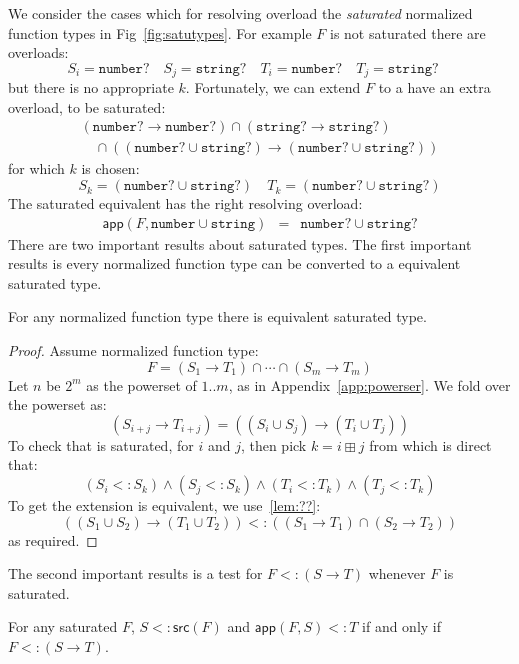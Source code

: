 \documentclass[acmsmall,review,screen]{acmart}
\newcommand{\NUMBER}{\mathtt{number}}
\newcommand{\STRING}{\mathtt{string}}
\newcommand{\APP}{\mathsf{app}}
\newcommand{\SRC}{\mathsf{src}}
\newcommand{\fun}{\mathbin{\rightarrow}}
\begin{document}
We consider the cases which for resolving overload the \emph{saturated}
normalized function types in Fig~\ref{fig:satutypes}. For example $F$
is not saturated there are overloads:
\[
  S_i = \NUMBER? \quad
  S_j = \STRING? \quad
  T_i = \NUMBER? \quad
  T_j = \STRING? \quad
\]
but there is no appropriate $k$. Fortunately, we can extend $F$
to a have an extra overload, to be saturated:
\[\begin{array}{l}
  (\NUMBER? \fun \NUMBER?) \cap (\STRING? \fun \STRING?) \\{}\quad
   \cap ((\NUMBER? \cup \STRING?) \fun (\NUMBER? \cup \STRING?))
\end{array}\]
for which $k$ is chosen:
\[
  S_k = (\NUMBER? \cup \STRING?) \quad
  T_k = (\NUMBER? \cup \STRING?)
\]
The saturated equivalent has the right resolving overload:
\[\begin{array}{rcl}
  \APP(F, \NUMBER \cup \STRING) & = & \NUMBER? \cup\STRING?
\end{array}\]
There are two important results about saturated types.
The first important results is every normalized function type can be converted to a equivalent saturated type.

\begin{lemma}
  For any normalized function type there is equivalent saturated type.
\end{lemma}

\begin{proof}
  Assume normalized function type:
  \[
    F = (S_1 \fun T_1) \cap \cdots \cap (S_{m} \fun T_{m})
  \]
  Let $n$ be $2^m$ as the powerset of $1..m$, as in Appendix~\ref{app:powerser}.
  We fold over the powerset as:
  \[
    (S_{i+j} \fun T_{i+j})
      = ((S_{i} \cup S_{j}) \fun (T_{i} \cup T_{j}))
  \]
  To check that is saturated, for $i$ and $j$, then pick $k = i \boxplus j$
  from which is direct that:
  \[
      (S_i <: S_k) \land
      (S_j <: S_k) \land
      (T_i <: T_k) \land
      (T_j <: T_k)
  \]
  To get the extension is equivalent, we use~\ref{lem:??}:
  \[
    ((S_1 \cup S_2) \fun (T_1 \cup T_2))
    <:
    ((S_1 \fun T_1) \cap (S_2 \fun T_2))
  \]
  as required.
\end{proof}

The second important results is a test for $F <: (S \fun T)$ whenever $F$ is saturated.

\begin{lemma}
  For any saturated $F$,
  $S <: \SRC(F)$
  and $\APP(F, S) <: T$
  if and only if
  $F <: (S \fun T)$.
\end{lemma}
\end{document}
